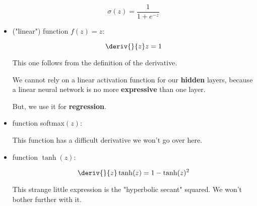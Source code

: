 \begin{itemize}
                \begin{equation}
                    \sigma(z) 
                    =
                    \frac{1}{1+e^{-z}}
                \end{equation}
                
            \item {} ("linear") function $f(z)=z$:
            
                \begin{equation}
                    \deriv{}{z} z
                    =
                    1
                \end{equation}
                
                This one follows from the definition of the derivative.
                
                We cannot rely on a linear activation function for our \textbf{hidden} layers, because a linear neural network is no more \textbf{expressive} than one layer.
                
                But, we use it for \textbf{regression}.
                
            \item {} function softmax$(z)$:
            
                This function has a difficult derivative we won't go over here. 
                
            \item {} function $\tanh(z)$:
            
                \begin{equation}
                    \deriv{}{z}\tanh(z)
                    =
                    1 - \tanh(z)^2
                \end{equation}
                
                This strange little expression is the "hyperbolic secant" squared. We won't bother further with it.\\
        \end{itemize}
        
